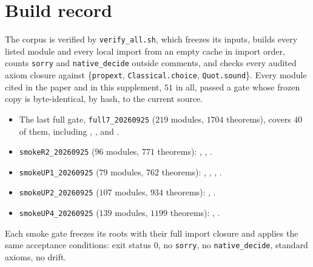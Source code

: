 \section*{Build record}
The corpus is verified by \texttt{verify\_all.sh}, which freezes its inputs, builds every listed
module and every local import from an empty cache in import order, counts \texttt{sorry} and
\texttt{native\_decide} outside comments, and checks every audited axiom closure against
\{\texttt{propext}, \texttt{Classical.choice}, \texttt{Quot.sound}\}. Every module cited in the
paper and in this supplement, $51$ in all, passed a gate whose frozen copy is byte-identical, by
hash, to the current source.
\begin{itemize}
\item The last full gate, \texttt{full7\_20260925} ($219$ modules, $1704$ theorems), covers $40$ of
them, including , ,
 and .
\item \texttt{smokeR2\_20260925} ($96$ modules, $771$ theorems): ,
, .
\item \texttt{smokeUP1\_20260925} ($79$ modules, $762$ theorems):
, , ,
.
\item \texttt{smokeUP2\_20260925} ($107$ modules, $934$ theorems): ,
.
\item \texttt{smokeUP4\_20260925} ($139$ modules, $1199$ theorems): ,
.
\end{itemize}
Each smoke gate freezes its roots with their full import closure and applies the same
acceptance conditions: exit status $0$, no \texttt{sorry}, no \texttt{native\_decide}, standard
axioms, no drift.

